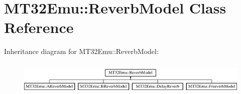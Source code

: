 \hypertarget{classMT32Emu_1_1ReverbModel}{\section{M\-T32\-Emu\-:\-:Reverb\-Model Class Reference}
\label{classMT32Emu_1_1ReverbModel}
}
Inheritance diagram for M\-T32\-Emu\-:\-:Reverb\-Model\-:\begin{figure}[H]
\begin{center}
\leavevmode
\includegraphics[height=1.647059cm]{classMT32Emu_1_1ReverbModel}
\end{center}
\end{figure}
